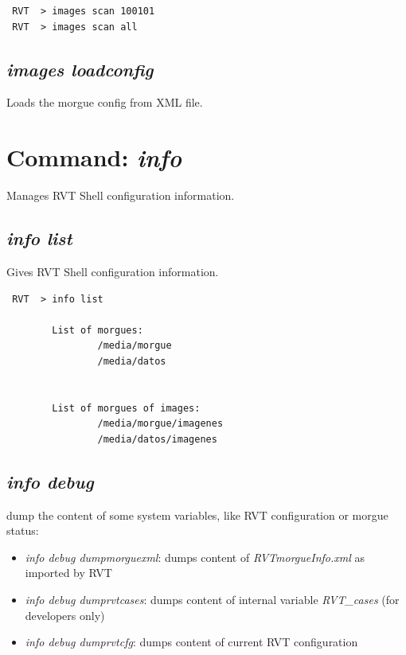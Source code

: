 \documentclass[a4paper,11pt,oneside]{report}
\begin{document}
\begin{verbatim}
 RVT  > images scan 100101
 RVT  > images scan all
\end{verbatim}

\subsection{\emph{images loadconfig}}

Loads the morgue config from XML file.


\section{Command: \emph{info}}

Manages RVT Shell configuration information.

\subsection{\emph{info list}}

Gives RVT Shell configuration information.

\begin{verbatim}
 RVT  > info list

        List of morgues:
                /media/morgue 
                /media/datos 


        List of morgues of images:
                /media/morgue/imagenes 
                /media/datos/imagenes 
\end{verbatim}



\subsection{\emph{info debug}} \label{cmd:info-debug}

dump the content of some system variables, like RVT configuration or morgue status:

\begin{itemize}
\item \emph{info debug dumpmorguexml}: dumps content of \emph{RVTmorgueInfo.xml} as imported by RVT
\item \emph{info debug dumprvtcases}: dumps content of internal variable \emph{RVT\_cases} (for developers only)
\item \emph{info debug dumprvtcfg}: dumps content of current RVT configuration
\end{itemize}
\end{document}
